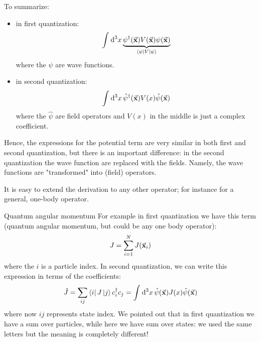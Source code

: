 \documentclass[../main/main.tex]{subfiles}
\begin{document}
To summarize:
\begin{itemize}
\item in first quantization:
\begin{equation*}
  \int_{}^{} \dd[3]{x} \underbrace{\psi ^\dag (\va{x}) V (\va{x}) \psi (\va{x})}_{\bra{\psi } V \ket{\psi } }
\end{equation*}
where the \( \psi  \) are wave functions.
\item in second quantization:
\begin{equation*}
  \int_{}^{} \dd[3]{x} \hat{\psi }^\dag (\va{x}) V (x) \hat{\psi }(\va{x})
\end{equation*}
where the \( \hat{\psi }  \) are field operators and \( V(x) \) in the middle is just a complex coefficient.
\end{itemize}
Hence, the expressions for the potential term are very similar in both first and second quantization, but there is an important difference: in the second quantization the wave function are replaced with the fields.
Namely, the wave functions are "transformed" into (field) operators.

It is easy to extend the derivation to any other operator; for instance for a general, one-body operator.
\begin{example}{Quantum angular momentum}{}
For example in first quantization we have this term (quantum angular momentum, but could be any one body operator):
 \begin{equation*}
   J = \sum_{i=1}^{N} J (\va{x}_i)
 \end{equation*}
 where the \( i \) is a particle index. In second quantization, we can write this expression in terms of the coefficients:
 \begin{equation*}
   \hat{J} = \sum_{ij}^{} \bra{i} J \ket{j} c_i ^\dag c_j = \int_{}^{} \dd[3]{x} \hat{\psi } (\va{x}) J (x) \hat{\psi } (\va{x})
 \end{equation*}
 where now \( ij \) represents state index.
 We pointed out that in first quantization we have a sum over particles, while here we have sum over states: we used the same letters but the meaning is completely different!
\end{example}
\end{document}
